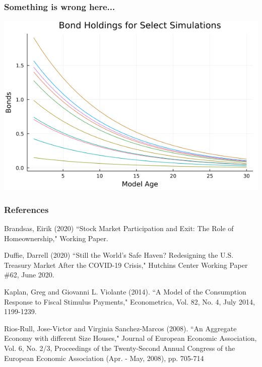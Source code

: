 \documentclass[handout]{beamer}
\begin{document}
\begin{frame}
\frametitle{Something is wrong here...}

\begin{center}
\includegraphics[scale = 0.5]{problem}
\end{center}

\end{frame}






\begin{frame}
\frametitle{References}
\scriptsize

Brandsas, Eirik (2020) ``Stock Market Participation and Exit: The Role of Homeownership," Working Paper.

\smallskip

Duffie, Darrell (2020) ``Still the World's Safe Haven? Redesigning the U.S. Treasury Market After the COVID-19 Crisis," Hutchins Center Working Paper \#62, June 2020.

\smallskip

Kaplan, Greg and Giovanni L. Violante (2014). ``A Model of the Consumption Response to Fiscal Stimulus Payments," Econometrica, Vol. 82, No. 4, July 2014, 1199-1239.

\smallskip

Rios-Rull, Jose-Victor and Virginia Sanchez-Marcos (2008). ``An Aggregate Economy with different Size Houses," Journal of European Economic Association, Vol. 6, No. 2/3, Proceedings of the Twenty-Second Annual Congress of the European Economic Association (Apr. - May, 2008), pp. 705-714

\end{frame}
\end{document}
